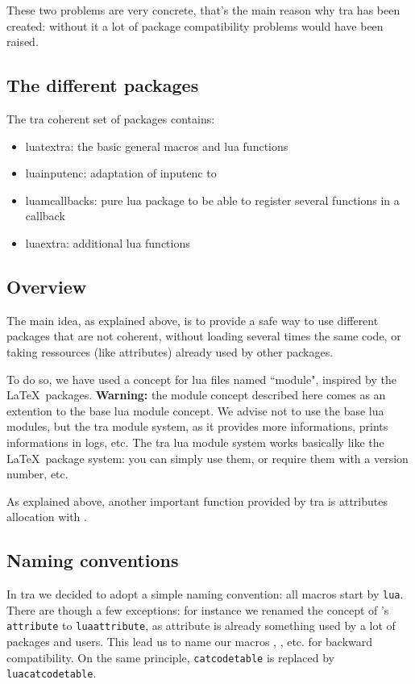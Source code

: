\documentclass{article}
\begin{document}
These two problems are very concrete, that's the main reason why \LuaTeX tra
has been created: without it a lot of package compatibility problems would
have been raised.

\subsection{The different packages}

The \LuaTeX tra coherent set of packages contains:

\begin{itemize}
  \item \textsf{luatextra}: the basic general macros and lua functions
  \item \textsf{luainputenc}: adaptation of \textsf{inputenc} to \LuaTeX
  \item \textsf{luamcallbacks}: pure lua package to be able to register
    several functions in a callback
  \item \textsf{luaextra}: additional lua functions
\end{itemize}

\subsection{Overview}

The main idea, as explained above, is to provide a safe way to use different
packages that are not coherent, without loading several times the same code,
or taking ressources (like attributes) already used by other packages.

To do so, we have used a concept for lua files named ``module", inspired by
the \LaTeX\ packages. \textbf{Warning:} the module concept described here
comes as an extention to the base lua module concept. We advise not to use the
base lua modules, but the \LuaTeX tra module system, as it provides more
informations, prints informations in logs, etc. The \LuaTeX tra lua module
system works basically like the \LaTeX\ package system: you can simply use
them, or require them with a version number, etc.

As explained above, another important function provided by \LuaTeX tra is
attributes allocation with \texttt{\string\newluaattribute}.

\subsection{Naming conventions}

In \LuaTeX tra we decided to adopt a simple naming convention: all macros
start by \texttt{lua}. There are though a few exceptions: for instance we
renamed the concept of \LuaTeX 's \texttt{attribute} to \texttt{luaattribute},
as attribute is already something used by a lot of packages and users. This
lead us to name our macros \texttt{\string\newluaattribute},
\texttt{\string\unsetluaattribute}, etc. for backward compatibility. On the
same principle, \texttt{catcodetable} is replaced by \texttt{luacatcodetable}.
\end{document}
